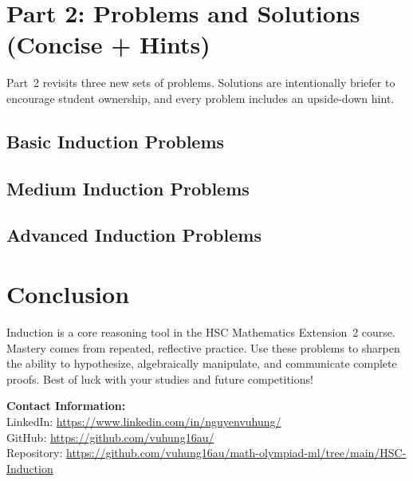 \documentclass[12pt]{article}
\begin{document}
\section{Part 2: Problems and Solutions (Concise + Hints)}
Part~2 revisits three new sets of problems. Solutions are intentionally briefer to encourage student ownership, and every problem includes an upside-down hint.

\subsection{Basic Induction Problems}



\subsection{Medium Induction Problems}


\subsection{Advanced Induction Problems}


\section{Conclusion}
Induction is a core reasoning tool in the HSC Mathematics Extension~2 course. Mastery comes from repeated, reflective practice. Use these problems to sharpen the ability to hypothesize, algebraically manipulate, and communicate complete proofs. Best of luck with your studies and future competitions!
\newpage



\newpage

\vspace{2em}
\noindent\textbf{Contact Information:}\\[0.5em]
LinkedIn: \href{https://www.linkedin.com/in/nguyenvuhung/}{https://www.linkedin.com/in/nguyenvuhung/}\\[0.3em]
GitHub: \href{https://github.com/vuhung16au/}{https://github.com/vuhung16au/}\\[0.3em]
Repository: \href{https://github.com/vuhung16au/math-olympiad-ml/tree/main/HSC-Induction}{https://github.com/vuhung16au/math-olympiad-ml/tree/main/HSC-Induction}
\end{document}
